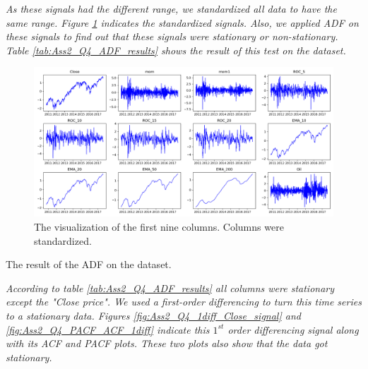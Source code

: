 \textit{As these signals had the different range, we  standardized all data to have the same range. Figure \ref{fig:Ass2_Q4_standard_data} indicates the standardized signals. Also, we applied \gls{ADF} on these signals to find out that these signals were stationary or non-stationary. Table \ref{tab:Ass2_Q4_ADF_results} shows the result of this test on the dataset.}

\begin{figure}[H]
    \centering
    \begin{minipage}[b]{1\textwidth}
        \includegraphics[width=\textwidth]{figures/Ass2/Ass2_Q4_standard_data.png}
    \end{minipage}
    \caption{The visualization of the first nine columns. Columns were standardized.}
    \label{fig:Ass2_Q4_standard_data}
\end{figure}


\begin{table}[H]
\centering
\caption{The result of the \gls{ADF} on the dataset.}
\label{tab:Ass2_Q4_ADF_results}

\end{table}

\textit{According to table \ref{tab:Ass2_Q4_ADF_results} all columns were stationary except the "Close price".  
We used a first-order differencing to turn this time series to a stationary data. Figures \ref{fig:Ass2_Q4_1diff_Close_signal} and \ref{fig:Ass2_Q4_PACF_ACF_1diff} indicate this $1^{st}$ order differencing signal along with its \gls{ACF} and \gls{PACF} plots. These two plots also show that the data got stationary.}

